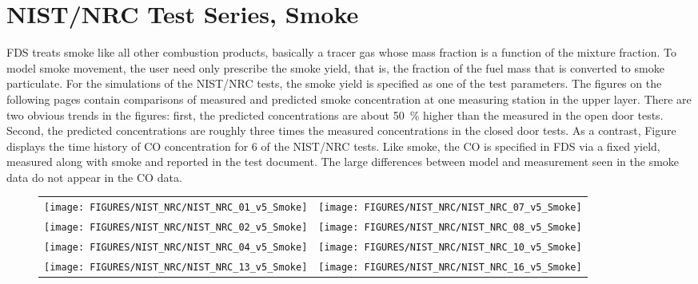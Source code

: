 \clearpage


\section{NIST/NRC Test Series, Smoke}

FDS treats smoke like all other combustion products, basically a tracer gas whose mass fraction is a function of the mixture fraction.
To model smoke movement, the user need only prescribe the smoke yield, that is, the fraction of the fuel mass that is
converted to smoke particulate.  For the simulations of the NIST/NRC tests, the smoke yield is specified as one of the test parameters.
The figures on the following pages contain comparisons of measured and predicted smoke concentration at one measuring station in the upper layer.
There are two obvious trends in the figures: first, the predicted concentrations are about 50~\% higher than the measured
in the open door tests.  Second,
the predicted concentrations are roughly three times the measured concentrations in the closed door tests.
As a contrast, Figure displays the time history of CO concentration for 6 of the NIST/NRC tests.
Like smoke, the CO is specified in FDS via a fixed yield, measured along with smoke and reported in the test document.
The large differences between model and measurement seen in the smoke data do not appear in the CO data.

\begin{figure}[p]
\begin{tabular*}{\textwidth}{l@{\extracolsep{\fill}}r}
\texttt{[image: FIGURES/NIST\_NRC/NIST\_NRC\_01\_v5\_Smoke]} &
\texttt{[image: FIGURES/NIST\_NRC/NIST\_NRC\_07\_v5\_Smoke]} \\
\texttt{[image: FIGURES/NIST\_NRC/NIST\_NRC\_02\_v5\_Smoke]} &
\texttt{[image: FIGURES/NIST\_NRC/NIST\_NRC\_08\_v5\_Smoke]} \\
\texttt{[image: FIGURES/NIST\_NRC/NIST\_NRC\_04\_v5\_Smoke]} &
\texttt{[image: FIGURES/NIST\_NRC/NIST\_NRC\_10\_v5\_Smoke]} \\
\texttt{[image: FIGURES/NIST\_NRC/NIST\_NRC\_13\_v5\_Smoke]} &
\texttt{[image: FIGURES/NIST\_NRC/NIST\_NRC\_16\_v5\_Smoke]}
\end{tabular*}
\end{figure}

